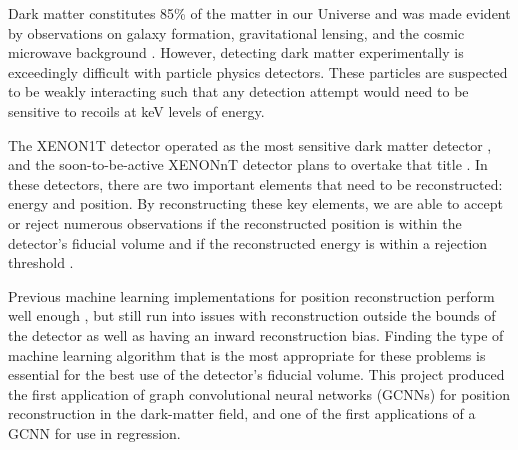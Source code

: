 Dark matter constitutes 85\% of the matter in our Universe and was made evident by observations on galaxy formation, gravitational lensing, and the cosmic microwave background \cite{DM_Hist}.
However, detecting dark matter experimentally is exceedingly difficult with particle physics detectors.
These particles are suspected to be weakly interacting \cite{1TDM_DataAnalysis} such that any detection attempt would need to be sensitive to recoils at keV levels of energy.

\par The XENON1T detector operated as the most sensitive dark matter detector \cite{Xenon1t}, and the soon-to-be-active XENONnT detector plans to overtake that title \cite{nT_Projection}.
In these detectors, there are two important elements that need to be reconstructed: energy and position.
By reconstructing these key elements, we are able to accept or reject numerous observations if the reconstructed position is within the detector's fiducial volume and if the reconstructed energy is within a rejection threshold \cite{1TDM_DataAnalysis}.

\par Previous machine learning implementations for position reconstruction perform well enough \cite{Bart}, but still run into issues with reconstruction outside the bounds of the detector as well as having an inward reconstruction bias.
Finding the type of machine learning algorithm that is the most appropriate for these problems is essential for the best use of the detector's fiducial volume.
This project produced the first application of graph convolutional neural networks (GCNNs) for position reconstruction in the dark-matter field, and one of the first applications of a GCNN for use in regression.
